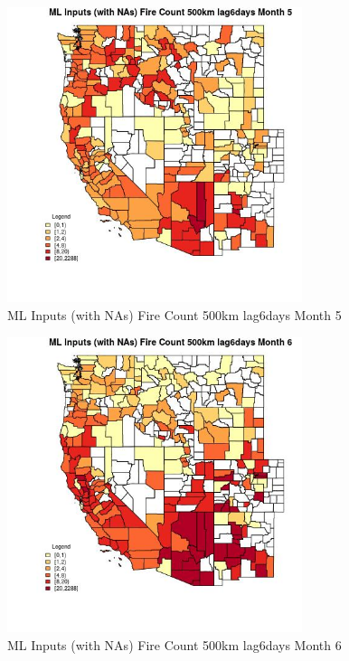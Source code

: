 \begin{figure} 
\centering  
\includegraphics[width=0.77\textwidth]{Code_Outputs/Report_ML_input_PM25_Step4_part_e_de_duplicated_aves_compiled_2019-05-20wNAs_CountyFire_Count_500km_lag6daysmedianMonth5.jpg} 
\caption{\label{fig:Report_ML_input_PM25_Step4_part_e_de_duplicated_aves_compiled_2019-05-20wNAsCountyFire_Count_500km_lag6daysmedianMonth5}ML Inputs (with NAs) Fire Count 500km lag6days Month 5} 
\end{figure} 
 

\begin{figure} 
\centering  
\includegraphics[width=0.77\textwidth]{Code_Outputs/Report_ML_input_PM25_Step4_part_e_de_duplicated_aves_compiled_2019-05-20wNAs_CountyFire_Count_500km_lag6daysmedianMonth6.jpg} 
\caption{\label{fig:Report_ML_input_PM25_Step4_part_e_de_duplicated_aves_compiled_2019-05-20wNAsCountyFire_Count_500km_lag6daysmedianMonth6}ML Inputs (with NAs) Fire Count 500km lag6days Month 6} 
\end{figure} 
 

